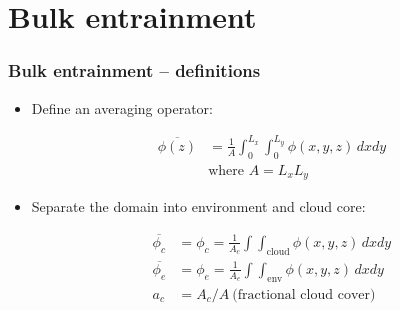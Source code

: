 \documentclass[fleqn,hyperref={colorlinks=true,linkcolor=blue,urlcolor=blue},numbers]{beamer}
\begin{document}
\section{Bulk entrainment}
\label{sec:bulk-entrainment}

\begin{frame}
  \frametitle{Bulk entrainment -- definitions}

  \begin{itemize}
  \item Define an averaging operator:

\begin{equation*}
  \label{eq:average}
  \begin{split}
  \overline{\phi(z)} &= \frac{1 }{A}\int_{ 0}^{L_x} \int_{ 0}^{L_y} \phi(x,y,z) \!\,dx dy \\
&\text{where\ \ }  A =L_x L_y
  \end{split}
\end{equation*} \pause


\item Separate the domain into environment and cloud core:


\begin{equation*}
  \label{eq:cloudy}
  \begin{split}
  \overline{\phi_c} &= \phi_c = \frac{1 }{A_c}\int \int_{\text{cloud}} \phi(x,y,z) \!\,dx dy \\
  \overline{\phi_e} &= \phi_e = \frac{1 }{A_e} \int \int_{\text{env}} \phi(x,y,z) \!\,dx dy \\
a_c &= A_c/A\ \text{(fractional cloud cover)}
  \end{split}
\end{equation*}

\end{itemize}
\end{frame}
\end{document}
